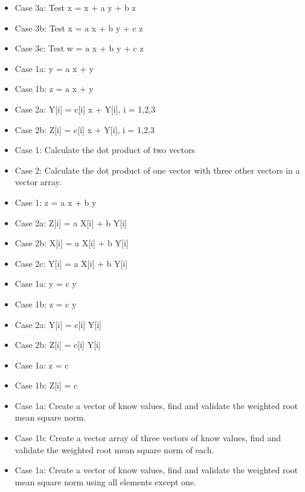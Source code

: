\begin{itemize}
\item {} Case 3a: Test x = x + a y + b z
\item {} Case 3b: Test x = a x + b y + c z
\item {} Case 3c: Test w = a x + b y + c z
\item {} Case 1a: y = a x + y
\item {} Case 1b: z = a x + y
\item {} Case 2a: Y[i] = c[i] x + Y[i], i = 1,2,3
\item {} Case 2b: Z[i] = c[i] x + Y[i], i = 1,2,3
\item {} Case 1: Calculate the dot product of two vectors
\item {} Case 2: Calculate the dot product of one vector with three other vectors in a vector array.
\item {} Case 1: z = a x + b y 
\item {} Case 2a: Z[i] = a X[i] + b Y[i]
\item {} Case 2b: X[i] = a X[i] + b Y[i]
\item {} Case 2c: Y[i] = a X[i] + b Y[i]
\item {} Case 1a: y = c y
\item {} Case 1b: z = c y
\item {} Case 2a: Y[i] = c[i] Y[i]
\item {} Case 2b: Z[i] = c[i] Y[i]
\item {} Case 1a: z = c
\item {} Case 1b: Z[i] = c
\item {} Case 1a: Create a vector of know values, find and validate the weighted root mean square norm.
\item {} Case 1b: Create a vector array of three vectors of know values, find and validate the weighted root mean square norm of each.
\item {} Case 1a: Create a vector of know values, find and validate the weighted root mean square norm using all elements except one.

\end{itemize}
